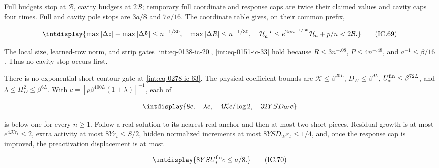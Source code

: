 
Full budgets stop at \(\mathcal B\), cavity budgets at \(2\mathcal B\); temporary full coordinate and response caps are twice their claimed values and cavity caps four times. Full and cavity pole stops are \(3a/8\) and \(7a/16\). The coordinate table gives, on their common prefix,


\begingroup\renewcommand{\theHequation}{intdisplay.663}
\begin{equation}
\intdisplay{
\max|\Delta z|+\max|\Delta\bar k|\le n^{-1/30},\quad
 \max|\Delta\bar R|\le n^{-1/30},\quad
 \mathcal H_a^{-I}\le e^{2\eta n^{-1/30}}\mathcal H_a+p/n
                                    <2\mathcal B.
}
\tag{IC.69}
\label{int:eq-0284-ic-69}
\end{equation}
\endgroup


The local size, learned-row norm, and strip gates \eqref{int:eq-0138-ic-20}, \eqref{int:eq-0151-ic-33} hold because \(R\le3n^{-.08}\), \(P\le4n^{-.48}\), and \(a^{-1}\le\beta/16\). Thus no cavity stop occurs first.



There is no exponential short-contour gate at \eqref{int:eq-0278-ic-63}. The physical coefficient bounds are \(\mathcal K\le\beta^{20L}\), \(D_W\le\beta^{9L}\), \(U_*^{\rm fin}\le\beta^{72L}\), and \(\lambda\le H_D^2\le\beta^{6L}\). With \(c=[p\beta^{100L}(1+\lambda)]^{-1}\), each of


\begingroup\renewcommand{\theHequation}{intdisplay.664}
\begin{equation*}
\intdisplay{
8c,\quad\lambda c,\quad4\mathcal Kc/\log2,
 \quad32YSD_Wc
}
\end{equation*}
\endgroup


is below one for every \(n\ge1\). Follow a real solution to its nearest real anchor and then at most two short pieces. Residual growth is at most \(e^{4\mathcal Kr_t}\le2\), extra activity at most \(8Yr_t\le S/2\), hidden normalized increments at most \(8YSD_Wr_t\le1/4\), and, once the response cap is improved, the preactivation displacement is at most


\begingroup\renewcommand{\theHequation}{intdisplay.665}
\begin{equation}
\intdisplay{
8YSU_*^{\rm fin}c\le a/8.
}
\tag{IC.70}
\label{int:eq-0285-ic-70}
\end{equation}
\endgroup

